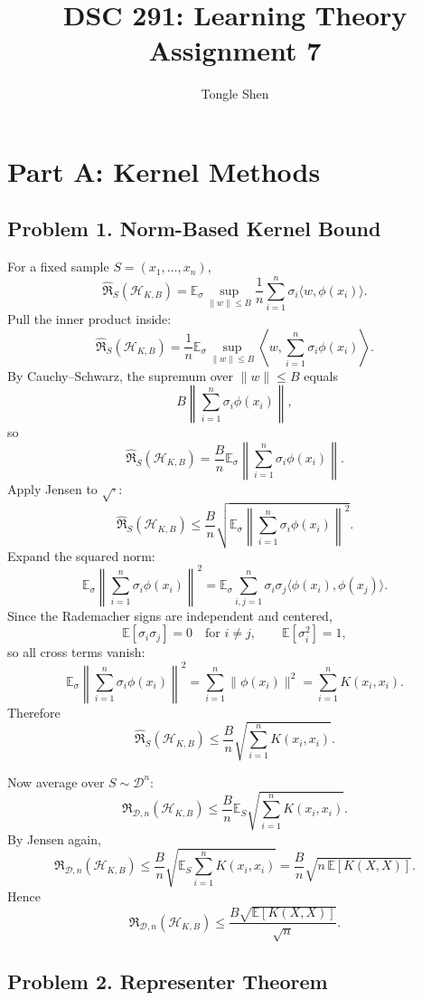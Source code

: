 \documentclass{article}
\title{DSC 291: Learning Theory Assignment 7}
\author{Tongle Shen}
\newcommand{\EE}{\mathbb{E}}
\newcommand{\cD}{\mathcal{D}}
\newcommand{\cH}{\mathcal{H}}
\begin{document}
\maketitle

\section{Part A: Kernel Methods}

\subsection{Problem 1. Norm-Based Kernel Bound}

For a fixed sample $S=(x_1,\dots,x_n)$,
$$
\widehat{\mathfrak{R}}_S(\cH_{K,B})
=
\EE_\sigma \sup_{\|w\|\le B}
\frac1n \sum_{i=1}^n \sigma_i \langle w,\phi(x_i)\rangle.
$$
Pull the inner product inside:
$$
\widehat{\mathfrak{R}}_S(\cH_{K,B})
=
\frac1n \EE_\sigma \sup_{\|w\|\le B}
\left\langle
w,\sum_{i=1}^n \sigma_i \phi(x_i)
\right\rangle.
$$
By Cauchy--Schwarz, the supremum over $\|w\|\le B$ equals
$$
B\left\|\sum_{i=1}^n \sigma_i \phi(x_i)\right\|,
$$
so
$$
\widehat{\mathfrak{R}}_S(\cH_{K,B})
=
\frac{B}{n}
\EE_\sigma
\left\|
\sum_{i=1}^n \sigma_i \phi(x_i)
\right\|.
$$
Apply Jensen to $\sqrt{\cdot}$:
$$
\widehat{\mathfrak{R}}_S(\cH_{K,B})
\le
\frac{B}{n}
\sqrt{
\EE_\sigma
\left\|
\sum_{i=1}^n \sigma_i \phi(x_i)
\right\|^2
}.
$$
Expand the squared norm:
$$
\EE_\sigma
\left\|
\sum_{i=1}^n \sigma_i \phi(x_i)
\right\|^2
=
\EE_\sigma
\sum_{i,j=1}^n \sigma_i \sigma_j \langle \phi(x_i),\phi(x_j)\rangle.
$$
Since the Rademacher signs are independent and centered,
$$
\EE[\sigma_i\sigma_j]=0
\quad\text{for }i\ne j,
\qquad
\EE[\sigma_i^2]=1,
$$
so all cross terms vanish:
$$
\EE_\sigma
\left\|
\sum_{i=1}^n \sigma_i \phi(x_i)
\right\|^2
=
\sum_{i=1}^n \|\phi(x_i)\|^2
=
\sum_{i=1}^n K(x_i,x_i).
$$
Therefore
$$
\widehat{\mathfrak{R}}_S(\cH_{K,B})
\le
\frac{B}{n}\sqrt{\sum_{i=1}^n K(x_i,x_i)}.
$$

Now average over $S\sim \cD^n$:
$$
\mathfrak{R}_{\cD,n}(\cH_{K,B})
\le
\frac{B}{n}
\EE_S
\sqrt{\sum_{i=1}^n K(x_i,x_i)}.
$$
By Jensen again,
$$
\mathfrak{R}_{\cD,n}(\cH_{K,B})
\le
\frac{B}{n}
\sqrt{
\EE_S \sum_{i=1}^n K(x_i,x_i)
}
=
\frac{B}{n}
\sqrt{
n\,\EE[K(X,X)]
}.
$$
Hence
$$
\mathfrak{R}_{\cD,n}(\cH_{K,B})
\le
\frac{B\sqrt{\EE[K(X,X)]}}{\sqrt{n}}.
$$

\subsection{Problem 2. Representer Theorem}
\end{document}
